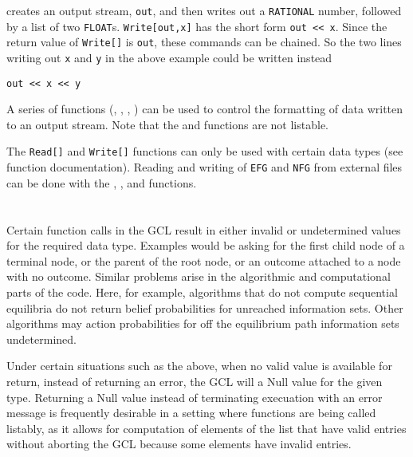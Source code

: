 \noindent
creates an output stream, \verb+out+, and then writes out a
\verb+RATIONAL+ number, followed by a list of two \verb+FLOAT+s.
\verb+Write[out,x]+ has the short form \verb+out << x+.  Since the
return value of \verb+Write[]+ is \verb+out+, these commands can be
chained.  So the two lines writing out \verb+x+ and \verb+y+ in the
above example could be written instead

\begin{verbatim}
out << x << y
\end{verbatim}
 
A series of  functions (,
, , )
can be used to control the formatting of data written to an output
stream.  Note that the  and  functions are
not listable.

The \verb+Read[]+ and \verb+Write[]+ functions can only be used with
certain data types (see function documentation).  Reading and writing
of \verb+EFG+ and \verb+NFG+ from external files can be done with the
, ,  and
 functions.

\section{}

Certain function calls in the GCL result in either invalid or
undetermined values for the required data type. Examples would be
asking for the first child node of a terminal node, or the parent of
the root node, or an outcome attached to a node with no outcome.
Similar problems arise in the algorithmic and computational parts of
the code.  Here, for example, algorithms that do not compute
sequential equilibria do not return belief probabilities for unreached
information sets.  Other algorithms may action probabilities for off
the equilibrium path information sets undetermined.  

Under certain situations such as the above, when no valid value is
available for return, instead of returning an error, the GCL will
a Null value for the given type.  Returning a Null value instead of
terminating execuation with an error message is frequently desirable
in a setting where functions are being called listably, as it allows
for computation of elements of the list that have valid entries
without aborting the GCL because some elements have invalid entries.  

